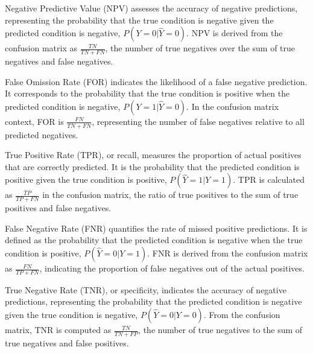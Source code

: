 \begin{definition}\label{def:npv}
Negative Predictive Value (NPV) assesses the accuracy of negative predictions, representing the probability that the true condition is negative given the predicted condition is negative, $P(Y=0|\hat{Y}=0)$. NPV is derived from the confusion matrix as $\frac{TN}{TN + FN}$, the number of true negatives over the sum of true negatives and false negatives.
\end{definition}

\begin{definition}\label{def:for}
False Omission Rate (FOR) indicates the likelihood of a false negative prediction. It corresponds to the probability that the true condition is positive when the predicted condition is negative, $P(Y=1|\hat{Y}=0)$. In the confusion matrix context, FOR is $\frac{FN}{TN + FN}$, representing the number of false negatives relative to all predicted negatives.
\end{definition}

\begin{definition}\label{def:tpr}
True Positive Rate (TPR), or recall, measures the proportion of actual positives that are correctly predicted. It is the probability that the predicted condition is positive given the true condition is positive, $P(\hat{Y}=1|Y=1)$. TPR is calculated as $\frac{TP}{TP + FN}$ in the confusion matrix, the ratio of true positives to the sum of true positives and false negatives.
\end{definition}

\begin{definition}\label{def:fnr}
False Negative Rate (FNR) quantifies the rate of missed positive predictions. It is defined as the probability that the predicted condition is negative when the true condition is positive, $P(\hat{Y}=0|Y=1)$. FNR is derived from the confusion matrix as $\frac{FN}{TP + FN}$, indicating the proportion of false negatives out of the actual positives.
\end{definition}

\begin{definition}\label{def:tnr}
True Negative Rate (TNR), or specificity, indicates the accuracy of negative predictions, representing the probability that the predicted condition is negative given the true condition is negative, $P(\hat{Y}=0|Y=0)$. From the confusion matrix, TNR is computed as $\frac{TN}{TN + FP}$, the number of true negatives to the sum of true negatives and false positives.
\end{definition}

